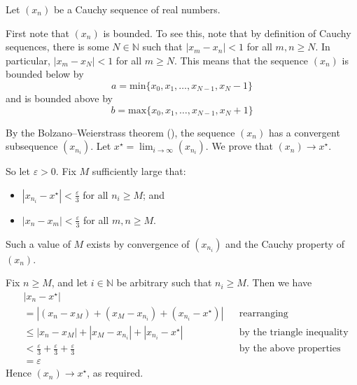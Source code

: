 \begin{cproof}
Let $(x_n)$ be a Cauchy sequence of real numbers.

First note that $(x_n)$ is bounded. To see this, note that by definition of Cauchy sequences, there is some $N \in \mathbb{N}$ such that $|x_m - x_n| < 1$ for all $m,n \ge N$. In particular, $|x_m - x_N| < 1$ for all $m \ge N$. This means that the sequence $(x_n)$ is bounded below by
\[ a = \mathrm{min} \{ x_0, x_1, \dots, x_{N-1}, x_N - 1 \} \]
and is bounded above by
\[ b = \mathrm{max} \{ x_0, x_1, \dots, x_{N-1}, x_N + 1 \} \]

By the Bolzano--Weierstrass theorem (), the sequence $(x_n)$ has a convergent subsequence $(x_{n_i})$. Let $x^{\star} = \lim_{i \to \infty} (x_{n_i})$. We prove that $(x_n) \to x^{\star}$.

So let $\varepsilon > 0$. Fix $M$ sufficiently large that:
\begin{itemize}
\item $|x_{n_i} - x^{\star}| < \frac{\varepsilon}{3}$ for all $n_i \ge M$; and
\item $|x_n - x_m| < \frac{\varepsilon}{3}$ for all $m,n \ge M$.
\end{itemize}
Such a value of $M$ exists by convergence of $(x_{n_i})$ and the Cauchy property of $(x_n)$.

Fix $n \ge M$, and let $i \in \mathbb{N}$ be arbitrary such that $n_i \ge M$. Then we have
\begin{align*}
& |x_n - x^{\star}| \\
&= |(x_n - x_M) + (x_M - x_{n_i}) + (x_{n_i} - x^{\star})| && \text{rearranging} \\
&\le |x_n - x_M| + |x_M - x_{n_i}| + |x_{n_i} - x^{\star}| && \text{by the triangle inequality} \\
&< \frac{\varepsilon}{3} + \frac{\varepsilon}{3} + \frac{\varepsilon}{3} && \text{by the above properties} \\
&= \varepsilon
\end{align*}
Hence $(x_n) \to x^{\star}$, as required.
\end{cproof}